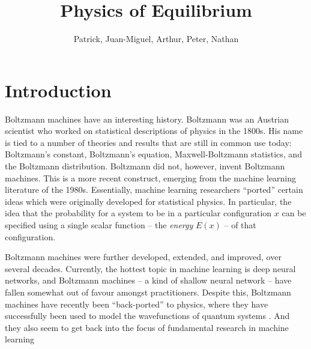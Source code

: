 \documentclass[nofootinbib, superscriptaddress, prl]{revtex4}
\begin{document}
\title{Physics of Equilibrium}
\author{Patrick, Juan-Miguel, Arthur, Peter, Nathan}
\maketitle


\section{Introduction}

\noindent{}

Boltzmann machines have an interesting history. Boltzmann was an Austrian scientist who worked on statistical descriptions of physics in the 1800s. His name is tied to a number of theories and results that are still in common use today: Boltzmann's constant, Boltzmann's equation, Maxwell-Boltzmann statistics, and the Boltzmann distribution. Boltzmann did not, however, invent Boltzmann machines. This is a more recent construct, emerging from the machine learning literature of the 1980s. Essentially, machine learning researchers ``ported'' certain ideas which were originally developed for statistical physics. In particular, the idea that the probability for a system to be in a particular configuration $x$ can be specified using a single scalar function -- the \emph{energy} $E(x)$ -- of that configuration. 

Boltzmann machines were further developed, extended, and improved, over several decades. Currently, the hottest topic in machine learning is deep neural networks, and Boltzmann machines -- a kind of shallow neural network -- have fallen somewhat out of favour amongst practitioners. Despite this, Boltzmann machines have recently been ``back-ported'' to physics, where they have successfully been used to model the wavefunctions of quantum systems \cite{carleo2017solving}. And they also seem to get back into the focus of fundamental research in machine learning 

\noindent{}
\end{document}
